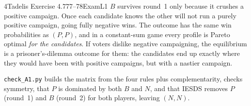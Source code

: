 \begin{exsol}{4}{Tadelis Exercise 4.7}{77--78}{Exam}{L1}
\interp $B$ survives round~1 only because it crushes a positive campaign. Once each candidate
knows the other will not run a purely positive campaign, going fully negative wins. The
outcome has the same win probabilities as $(P,P)$, and in a constant-sum game every profile is
Pareto optimal \emph{for the candidates}. If voters dislike negative campaigning, the
equilibrium is a prisoner's-dilemma outcome for them: the candidates end up exactly where they
would have been with positive campaigns, but with a nastier campaign.

\verify \texttt{check\_A1.py} builds the matrix from the four rules plus complementarity, checks
symmetry, that $P$ is dominated by both $B$ and $N$, and that IESDS removes $P$ (round~1) and
$B$ (round~2) for both players, leaving $(N, N)$.

\end{exsol}
